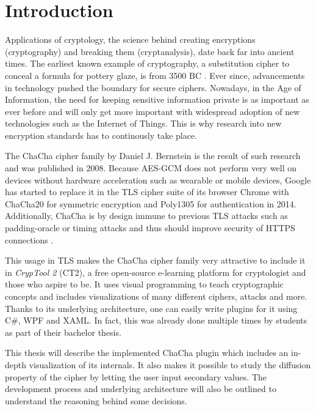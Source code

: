 
\chapter{Introduction}

Applications of cryptology, the science behind creating encryptions (cryptography) and breaking them (cryptanalysis), date back far into ancient times. The earliest known example of  cryptography, a substitution cipher to conceal a formula for pottery glaze, is from 3500 BC \cite{history}. Ever since, advancements in technology pushed the boundary for secure ciphers. Nowadays, in the Age of Information, the need for keeping sensitive information private is as important as ever before and will only get more important with widespread adoption of new technologies such as the Internet of Things. This is why research into new encryption standards has to continously take place.

The ChaCha cipher family by Daniel J. Bernstein is the result of such research and was published in 2008. Because AES-GCM does not perform very well on devices without hardware acceleration such as wearable or mobile devices, Google has started to replace it in the TLS cipher suite of its browser Chrome with ChaCha20 for symmetric encryption and Poly1305 for authentication in 2014. Additionally, ChaCha is by design immune to previous TLS attacks such as padding-oracle or timing attacks and thus should improve security of HTTPS connections \cite{googlesecurityblog}.

This usage in TLS makes the ChaCha cipher family very attractive to include it in \textit{CrypTool 2} (CT2), a free open-source e-learning platform for cryptologist and those who aspire to be. It uses visual programming to teach cryptographic concepts and includes visualizations of many different ciphers, attacks and more. Thanks to its underlying architecture, one can easily write plugins for it using C\#, WPF and XAML. In fact, this was already done multiple times by students as part of their bachelor thesis.

This thesis will describe the implemented ChaCha plugin which includes an in-depth visualization of its internals. It also makes it possible to study the diffusion property of the cipher by letting the user input secondary values. The development process and underlying architecture will also be outlined to understand the reasoning behind some decisions.